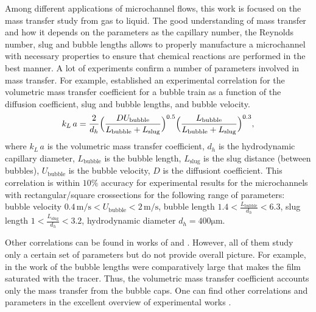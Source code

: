 \documentclass{article}
\newcommand{\vol}{k_L\,a}
\newcommand{\lbubble}{L_{\mathrm{bubble}}}
\newcommand{\lslug}{L_{\mathrm{slug}}}
\newcommand{\ububble}{U_{\mathrm{bubble}}}
\begin{document}
Among different applications of microchannel flows, this work is focused on the mass transfer
study from gas to liquid. The good understanding of mass transfer and how it depends on the
parameters as the capillary number, the Reynolds number, slug and bubble lengths allows to properly
manufacture a microchannel with necessary properties to ensure that chemical
reactions are performed in the best manner. A lot of experiments \cite{bercic-mass,irandoust,kreutzer-overview} confirm 
a number of parameters involved in mass transfer. 
For example,
\citet{yue-mass} established an experimental correlation for the volumetric mass transfer coefficient for a bubble train as
a function of the diffusion coefficient, slug and bubble lengths, and bubble velocity.  
\begin{equation}
\vol =\frac{2}{d_h} \Bigl(\frac{D
\ububble}{\lbubble+\lslug}\Bigr)^{0.5}
\Bigl(\frac{\lbubble}{\lbubble+\lslug}\Bigr)^{0.3},
\end{equation}
where $\vol$ is the volumetric mass transfer coefficient, $d_h$ is the hydrodynamic capillary
diameter, $\lbubble$ is the bubble length, $\lslug$ is the slug distance (between bubbles),
$\ububble$ is the bubble velocity, $D$ is the diffusiont coefficient. This correlation is within $10\%$ accuracy for experimental
results for the microchannels with rectangular/square crossections for the following range of
parameters: bubble velocity $0.4\,\mathrm{m/s}<\ububble<2\,\mathrm{m/s}$, bubble length
$1.4<\frac{\lbubble}{d_h}<6.3$, slug length $1<\frac{\lslug}{d_h}<3.2$,
hydrodynamic diameter $d_h = 400 \mathrm{\mu m}$.

Other correlations can be found in works of \citet{kreutzer-overview}
and \citet{bercic-mass}. However, all of them study only a certain set of parameters but do not provide overall picture. 
For example, in the work of \citet{bercic-mass} the bubble lengths were comparatively large that makes the film saturated
with the tracer. Thus, the volumetric mass transfer coefficient accounts only the mass transfer from the bubble caps. 
One can find other correlations and parameters in  the excellent overview of experimental works \cite{yue-mass}.
\end{document}
